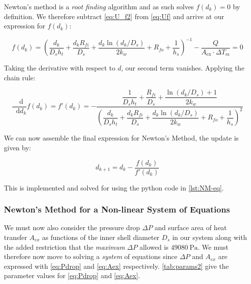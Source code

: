 \documentclass[11pt, a4paper]{article}
\theoremstyle{definition}
\newcommand{\dif}{\mathop{}\!\mathrm{d}}
\begin{document}
Newton's method is a \textit{root finding} algorithm and as such solves
$f(d_k) = 0$ by definition. We therefore subtract \cref{eq:U_f2} from
\cref{eq:Uf} and arrive at our expression for $f(d_k)$:

\begin{equation}
    f(d_k) = \left(
    \frac{d_k}{D_s h_t}
    + \frac{d_k R_{fi}}{D_s}
    + \frac{d_k \ln(d_k / D_s)}{2k_w}
    + R_{fo} + \frac{1}{h_s}
  \right)^{-1} - \frac{Q}{A_{\mathrm{ex}}\cdot \Delta T_m} = 0
    \label{eq:f(d)}
\end{equation}

Taking the derivative with respect to $d$, our second term vanishes.
Applying the chain rule:

\begin{equation}
    \frac{\dif}{\dif d_k} f(d_k) = f'(d_k) =
    -\frac{
        \dfrac{1}{D_s h_t} + \dfrac{R_{fi}}{D_s} + \dfrac{\ln(d_k/D_s) + 1}{2k_w}
    }{
        \left(
            \dfrac{d_k}{D_s h_t}
            + \dfrac{d_k R_{fi}}{D_s}
            + \dfrac{d_k \ln(d_k/D_s)}{2k_w}
            + R_{fo} + \dfrac{1}{h_s}
        \right)^{2}
    }
    \label{eq:f'(d)}
\end{equation}

We can now assemble the final expression for Newton's Method, the update is given by:

\begin{equation}
    d_{k+1} = d_k - \frac{f(d_k)}{f'(d_k)}
    \label{eq:newtonsmethod}
\end{equation}

This is implemented and solved for using the python code in \cref{lst:NM-eq}.

\subsubsection{Newton's Method for a Non-linear System of Equations}

We must now also consider the pressure drop $\Delta P$ and surface area of heat transfer $A_{ex}$ as functions of the inner shell diameter $D_s$ in our system along with the added restriction that the \textit{maximum} $\Delta P$ allowed is $49080\ \mathrm{Pa}$. We must therefore now move to solving a \textit{system} of equations since $\Delta P$ and $A_{ex}$ are expressed with \cref{eq:Pdrop} and \cref{eq:Aex} respectively. \cref{tab:params2} give the parameter values for \cref{eq:Pdrop} and \cref{eq:Aex}.
\end{document}
